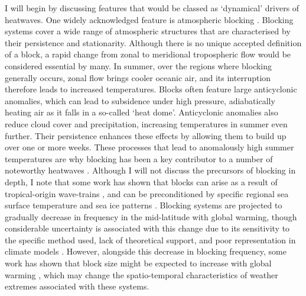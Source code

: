   I will begin by discussing features that would be classed as `dynamical' drivers of heatwaves. One widely acknowledged feature is atmospheric blocking \citep{garriott_long-range_1904,kautz_atmospheric_2022}. Blocking systems cover a wide range of atmospheric structures that are characterised by their persistence and stationarity. Although there is no unique accepted definition of a block, a rapid change from zonal to meridional tropospheric flow would be considered essential by many. In summer, over the regions where blocking generally occurs, zonal flow brings cooler oceanic air, and its interruption therefore leads to increased temperatures. Blocks often feature large anticyclonic anomalies, which can lead to subsidence under high pressure, adiabatically heating air as it falls in a so-called `heat dome'. Anticyclonic anomalies also reduce cloud cover and precipitation, increasing temperatures in summer even further. Their persistence enhances these effects by allowing them to build up over one or more weeks. These processes that lead to anomalously high summer temperatures are why blocking has been a key contributor to a number of noteworthy heatwaves \citep{woollings_blocking_2018}. Although I will not discuss the precursors of blocking in depth, I note that some work has shown that blocks can arise as a result of tropical-origin wave-trains \citep{schneidereit_large-scale_2012,greatbatch_tropical_2015}, and can be preconditioned by specific regional sea surface temperature and sea ice patterns \citep{di_capua_drivers_2021,wang_summer_2020}. Blocking systems are projected to gradually decrease in frequency in the mid-latitude with global warming, though considerable uncertainty is associated with this change due to its sensitivity to the specific method used, lack of theoretical support, and poor representation in climate models \citep{woollings_blocking_2018}. However, alongside this decrease in blocking frequency, some work has shown that block size might be expected to increase with global warming \citep{nabizadeh_size_2019}, which may change the spatio-temporal characteristics of weather extremes associated with these systems.

